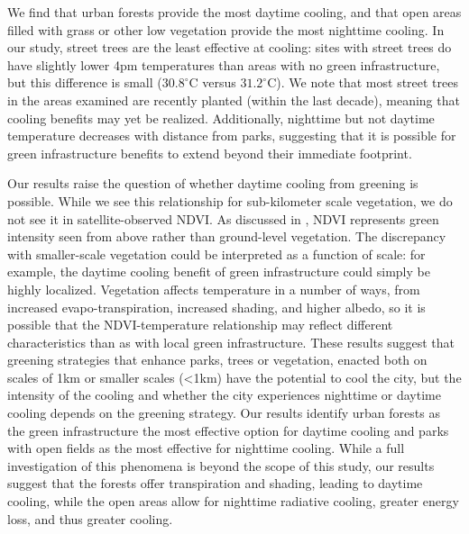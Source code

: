 \documentclass[draft,linenumbers]{agujournal}
\begin{document}
We find that urban forests provide the most daytime cooling, and that open areas filled with grass or other low vegetation provide the most nighttime cooling. 
In our study, street trees are the least effective at cooling:  sites with street trees do have slightly lower 4pm temperatures than areas with no green infrastructure, but this difference is small ($30.8^\circ$C versus $31.2^\circ$C). 
We note that most street trees in the areas examined are recently planted (within the last decade), meaning that cooling benefits may yet be realized. 
Additionally, nighttime but not daytime temperature decreases with distance from parks, suggesting that it is possible for green infrastructure benefits to extend beyond their immediate footprint. 

Our results raise the question of whether daytime cooling from greening is possible. While we see this relationship for sub-kilometer scale vegetation, we do not see it in satellite-observed NDVI. 
As discussed in \cite{scott2017temperature}, NDVI represents green intensity seen from above rather than ground-level vegetation. 
The discrepancy with smaller-scale vegetation could be interpreted as a function of scale: for example, the daytime cooling benefit of green infrastructure could simply be highly localized. 
Vegetation affects temperature in a number of ways, from increased evapo-transpiration, increased shading, and higher albedo, so it is possible that the NDVI-temperature relationship may reflect different characteristics than as with local green infrastructure. 
These results suggest that greening strategies that enhance parks, trees or vegetation, enacted both on scales of 1km or smaller scales (<1km) have the potential to cool the city, but the intensity of the cooling and whether the city experiences nighttime or daytime cooling depends on the greening strategy. Our results identify urban forests as the green infrastructure the most effective option for daytime cooling and parks with open fields as the most effective for nighttime cooling. 
While a full investigation of this phenomena is beyond the scope of this study, our results suggest that the forests offer transpiration and shading, leading to daytime cooling, while the open areas allow for nighttime radiative cooling, greater energy loss, and thus greater cooling. 
\end{document}
